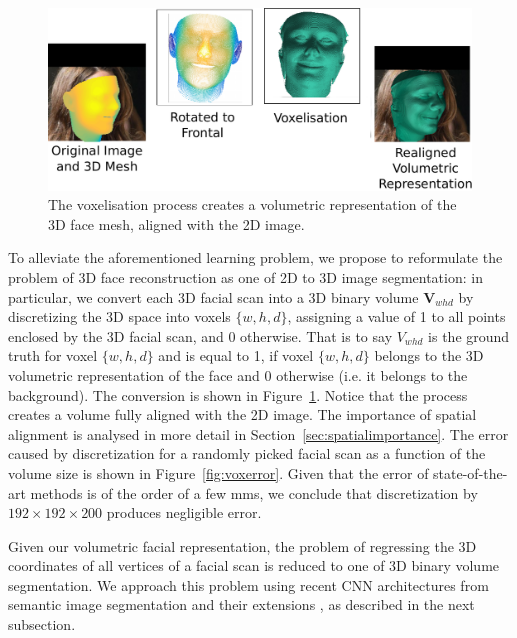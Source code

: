 \begin{figure}
  \centering
  \includegraphics[width=0.9\linewidth]{img/discretisation.pdf}
  \caption[Dataset voxelisation procedure]{The voxelisation process
    creates a volumetric representation of the 3D face mesh, aligned
    with the 2D image.}
  \label{fig:discretisation}
\end{figure}

To alleviate the aforementioned learning problem, we propose to
reformulate the problem of 3D face reconstruction as one of 2D to 3D
image segmentation: in particular, we convert each 3D facial scan into
a 3D binary volume $\mathbf{V}_{whd}$ by discretizing the 3D space
into voxels $\{w,h,d\}$, assigning a value of 1 to all points enclosed
by the 3D facial scan, and 0 otherwise. That is to say $ V_{whd}$ is
the ground truth for voxel $\{w,h,d\}$ and is equal to 1, if voxel
$\{w,h,d\}$ belongs to the 3D volumetric representation of the face
and 0 otherwise (i.e. it belongs to the background). The conversion is
shown in Figure~\ref{fig:discretisation}. Notice that the process
creates a volume fully aligned with the 2D image. The importance of
spatial alignment is analysed in more detail in
Section~\ref{sec:spatialimportance}. The error caused by
discretization for a randomly picked facial scan as a function of the
volume size is shown in Figure~\ref{fig:voxerror}. Given that the error
of state-of-the-art methods \cite{roth2016adaptive,liu2016joint} is of
the order of a few mms, we conclude that discretization by
$192\times 192\times 200$ produces negligible error.

Given our volumetric facial representation, the problem of regressing
the 3D coordinates of all vertices of a facial scan is reduced to one
of 3D binary volume segmentation. We approach this problem using
recent CNN architectures from semantic image segmentation
\cite{long2015fully} and their extensions \cite{newell2016stacked}, as
described in the next subsection.

